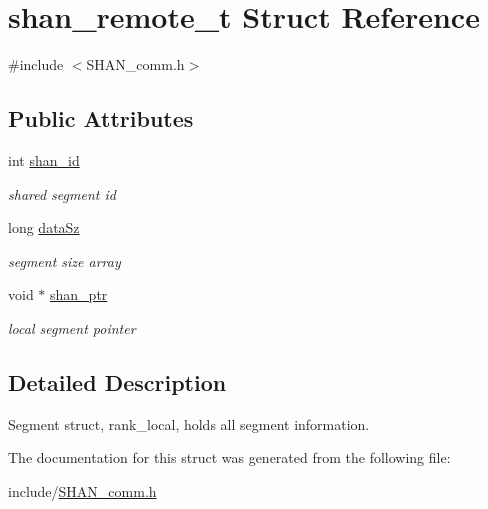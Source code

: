 \hypertarget{structshan__remote__t}{}\section{shan\+\_\+remote\+\_\+t Struct Reference}
\label{structshan__remote__t}


{\ttfamily \#include $<$S\+H\+A\+N\+\_\+comm.\+h$>$}

\subsection*{Public Attributes}
\begin{DoxyCompactItemize}
\item 
int \hyperlink{structshan__remote__t_a1b23c142128b38ded6fbeebd87daad3e}{shan\+\_\+id}\hypertarget{structshan__remote__t_a1b23c142128b38ded6fbeebd87daad3e}{}\label{structshan__remote__t_a1b23c142128b38ded6fbeebd87daad3e}

\begin{DoxyCompactList}\small\item\em shared segment id \end{DoxyCompactList}\item 
long \hyperlink{structshan__remote__t_aa70d5714424043c96b0d612b664d985a}{data\+Sz}\hypertarget{structshan__remote__t_aa70d5714424043c96b0d612b664d985a}{}\label{structshan__remote__t_aa70d5714424043c96b0d612b664d985a}

\begin{DoxyCompactList}\small\item\em segment size array \end{DoxyCompactList}\item 
void $\ast$ \hyperlink{structshan__remote__t_aa928d17d58a533646435dcff0435003e}{shan\+\_\+ptr}\hypertarget{structshan__remote__t_aa928d17d58a533646435dcff0435003e}{}\label{structshan__remote__t_aa928d17d58a533646435dcff0435003e}

\begin{DoxyCompactList}\small\item\em local segment pointer \end{DoxyCompactList}\end{DoxyCompactItemize}


\subsection{Detailed Description}
Segment struct, rank\+\_\+local, holds all segment information. 

The documentation for this struct was generated from the following file\+:\begin{DoxyCompactItemize}
\item 
include/\hyperlink{SHAN__comm_8h}{S\+H\+A\+N\+\_\+comm.\+h}\end{DoxyCompactItemize}
